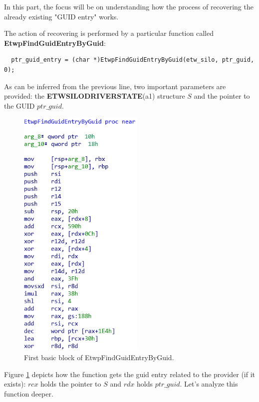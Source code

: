   In this part, the focus will be on understanding how the process of recovering the already existing "GUID entry" works.

  The action of recovering is performed by a particular function called {\bfseries EtwpFindGuidEntryByGuid}:

  \begin{verbatim}
  ptr_guid_entry = (char *)EtwpFindGuidEntryByGuid(etw_silo, ptr_guid, 0);
  \end{verbatim}

  As can be inferred from the previous line, two important parameters are provided: the {\bfseries ETWSILODRIVERSTATE}(a1) structure $S$ and the pointer to the GUID $ptr\_guid$.

  \begin{centering}
  \begin{figure}[H]
    \includegraphics[width=6cm]{images/etwpfindguidguidentrybyguid1.png}
    \caption[]{First basic block of EtwpFindGuidEntryByGuid.}
    \label{fig:EtwpFindGuidEntryByGuid}
  \end{figure}
  \end{centering}

  Figure \ref{fig:EtwpFindGuidEntryByGuid} depicts how the function gets the guid entry related to the provider (if it exists): $rcx$ holds the pointer to $S$ and $rdx$ holds $ptr\_guid$. Let's analyze this function deeper.

